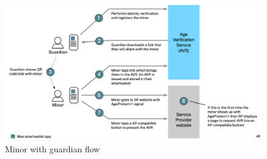 \documentclass[11pt, oneside]{article}   	%
\begin{document}
\begin{figure}
	\includegraphics[width=\textwidth]{./images/guardian+minor.png}
	\caption{Minor with guardian flow}
	\label{fig:guardian+minor}
\end{figure}
\end{document}
